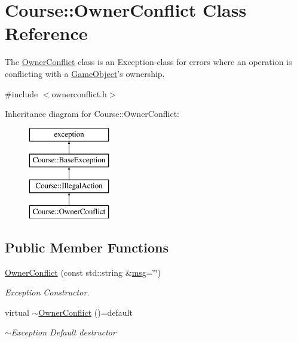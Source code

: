\hypertarget{classCourse_1_1OwnerConflict}{\section{Course\-:\-:Owner\-Conflict Class Reference}
\label{classCourse_1_1OwnerConflict}
}


The \hyperlink{classCourse_1_1OwnerConflict}{Owner\-Conflict} class is an Exception-\/class for errors where an operation is conflicting with a \hyperlink{classCourse_1_1GameObject}{Game\-Object}'s ownership.  




{\ttfamily \#include $<$ownerconflict.\-h$>$}

Inheritance diagram for Course\-:\-:Owner\-Conflict\-:\begin{figure}[H]
\begin{center}
\leavevmode
\includegraphics[height=4.000000cm]{classCourse_1_1OwnerConflict}
\end{center}
\end{figure}
\subsection*{Public Member Functions}
\begin{DoxyCompactItemize}
\item 
\hyperlink{classCourse_1_1OwnerConflict_a0f224a172a2cdab0471bc5fc8569c80a}{Owner\-Conflict} (const std\-::string \&\hyperlink{classCourse_1_1BaseException_ac5a744a6af6f2ba9198b58e52bb62f5a}{msg}=\char`\"{}\char`\"{})
\begin{DoxyCompactList}\small\item\em Exception Constructor. \end{DoxyCompactList}\item 
virtual \hyperlink{classCourse_1_1OwnerConflict_a487d89f256b1eb070101affa7ea1b569}{$\sim$\-Owner\-Conflict} ()=default
\begin{DoxyCompactList}\small\item\em $\sim$\-Exception Default destructor \end{DoxyCompactList}\end{DoxyCompactItemize}



